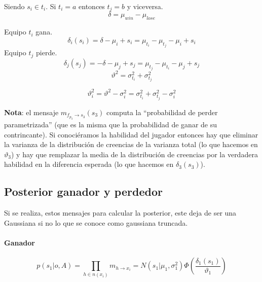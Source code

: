 \documentclass[11pt,twoside, spanish]{report} %
\begin{document}
Siendo $s_i \in t_i$. Si $t_i = a$ entonces $t_j=b$ y viceversa.
\begin{equation}
	\delta = \mu_{win} - \mu_{lose}
\end{equation}

Equipo $t_i$ gana.
\begin{equation}
	\delta_i(s_i) = \delta -\mu_i+s_i =\mu_{t_i} - \mu_{t_j}-\mu_i+s_i
\end{equation}
Equipo $t_j$ pierde.
\begin{equation}
	\delta_j(s_j) = -\delta -\mu_j+s_j = \mu_{t_j}-\mu_{t_i}-\mu_j+s_j
\end{equation}
\begin{equation}
	\vartheta^2 = \sigma_{t_i}^2 + \sigma_{t_j}^2
\end{equation}

\begin{equation}
	\vartheta_i^2 = \vartheta^2 - \sigma_i^2 = \sigma_{t_i}^2 + \sigma_{t_j}^2 - \sigma_i^2
\end{equation}


\textbf{Nota}: el mensaje $m_{f_{p_3} \rightarrow s_3}(s_3)$ computa la ``probabilidad de perder parametrizada'' (que es la misma que la probabilidad de ganar de su contrincante). Si conoci\'eramos la habilidad del jugador entonces hay que eliminar la varianza de la distribuci\'on de creencias de la varianza total (lo que hacemos en $\vartheta_3$) y hay que remplazar la media de la distribuci\'on de creencias por la verdadera habilidad en la diferencia esperada (lo que hacemos en $\delta_3(s_3)$).







\subsection{Posterior ganador y perdedor}
\label{appendix:trunc}
Si se realiza, estos mensajes para calcular la posterior, este deja de ser una Gaussiana si no lo que se conoce como gaussiana truncada.

\paragraph{Ganador}
\begin{equation}\label{eq:posterior_ganador}
	p(s_1|o,A) = \prod_{h \in n(x_i)} m_{h \rightarrow x_i} =  N(s_1| \mu_1, \sigma_1^2)  \Phi\left(\frac{\delta_1(s_1)}{\vartheta_1}\right)
\end{equation}
\end{document}
